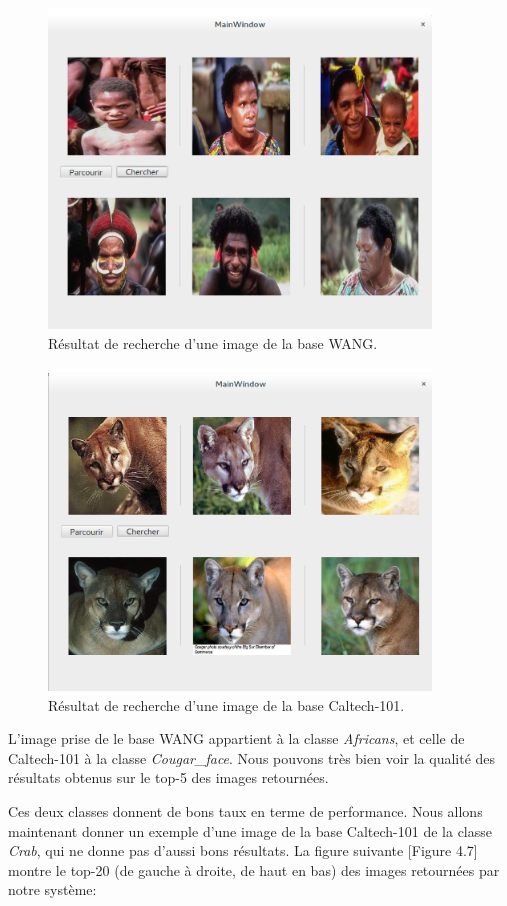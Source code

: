 \begin{figure}[H]
	\centering
		\includegraphics[width=4in]{Figures/guiTests1.png}
	\caption[]{Résultat de recherche d'une image de la base WANG.}
	\label{fig:Electron}
\end{figure}

\begin{figure}[H]
	\centering
		\includegraphics[width=4in]{Figures/guiTests2.png}
	\caption[]{Résultat de recherche d'une image de la base Caltech-101.}
	\label{fig:Electron}
\end{figure}


	L'image prise de le base WANG appartient à la classe \textit{Africans}, et celle de Caltech-101 à la classe \textit{Cougar\_face}. Nous pouvons très bien voir la qualité des résultats obtenus sur le top-5 des images retournées.
	
	Ces deux classes donnent de bons taux en terme de performance. Nous allons maintenant donner un exemple d'une image de la base Caltech-101 de la classe \textit{Crab}, qui ne donne pas d'aussi bons résultats. La figure suivante [Figure 4.7] montre le top-20 (de gauche à droite, de haut en bas) des images retournées par notre système:

